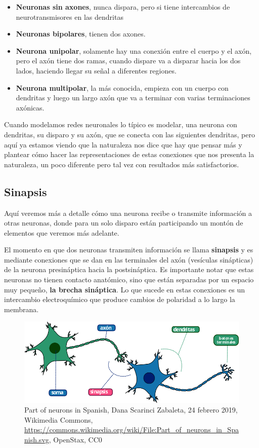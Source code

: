 \begin{itemize}
\item \textbf{Neuronas sin axones}, nunca dispara, pero si tiene intercambios de neurotransmisores en las dendritas 
\item \textbf{Neuronas bipolares}, tienen dos axones. 
\item \textbf{Neurona unipolar}, solamente hay una conexión entre el cuerpo y el axón, pero el axón tiene dos ramas, cuando dispare va a disparar hacia los dos lados, haciendo llegar su señal a diferentes regiones. 
\item \textbf{Neurona multipolar}, la más conocida, empieza con un cuerpo con dendritas y luego un largo axón que va a terminar con varias terminaciones axónicas. 
\end{itemize}


Cuando modelamos redes neuronales lo típico es modelar, una neurona con dendritas, su disparo y su axón, que se conecta con las siguientes dendritas, pero aquí ya estamos viendo que la naturaleza nos dice que hay que pensar más y plantear cómo hacer las representaciones de estas conexiones que nos presenta la naturaleza, un poco diferente pero tal vez con resultados más satisfactorios.




\subsection{Sinapsis}


Aquí veremos más a detalle cómo una neurona recibe o transmite información a otras neuronas, donde para un solo disparo están participando un montón de elementos que veremos más adelante.


 El momento en que dos neuronas transmiten información se llama \textbf{sinapsis} y es mediante conexiones que se dan en las terminales del axón (vesículas sinápticas) de la neurona presináptica hacia la postsináptica. Es importante notar que estas neuronas no tienen contacto anatómico, sino que están separadas por un espacio muy pequeño, \textbf{la brecha sináptica}. Lo que sucede en estas conexiones es un intercambio electroquímico que produce cambios de polaridad a lo largo la membrana. 




\begin{figure}[h]
 \centering
 \includegraphics[scale=0.5]{../Figuras/Part_of_neurons_in_Spanish.png}
 \caption{Part of neurons in Spanish, Dana Scarinci Zabaleta, 24 febrero 2019, Wikimedia Commons, \url{https://commons.wikimedia.org/wiki/File:Part_of_neurons_in_Spanish.svg}, OpenStax, CC0}
 \label{fig:sinapsisN}
\end{figure}


